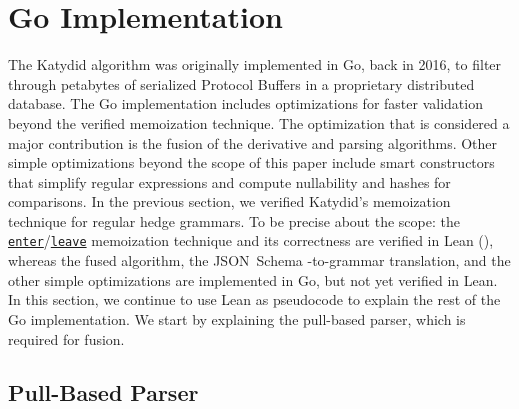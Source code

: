 \documentclass[runningheads]{llncs}
\newcommand{\link}[2]{\mbox{\hyperref[#2]{\lstinline{#1}}}\xspace}
\newcommand{\enter}{\link{enter}{def enter}}
\newcommand{\leave}{\link{leave}{def leave}}
\newcommand{\JSONSchema}{%
  JSON~Schema\xspace%
}
\begin{document}
\section{Go Implementation}
\label{section_go}

The Katydid algorithm was originally implemented in Go, back in 2016, to filter through petabytes of serialized Protocol Buffers in a proprietary distributed database.
The Go implementation includes optimizations for faster validation beyond the verified memoization technique.
The optimization that is considered a major contribution is the fusion of the derivative and parsing algorithms.
Other simple optimizations beyond the scope of this paper include smart constructors that simplify regular expressions and compute nullability and hashes for comparisons.
In the previous section, we verified Katydid's memoization technique for regular hedge grammars.
To be precise about the scope: the \enter/\leave memoization technique and its correctness are verified in Lean (), whereas the fused algorithm, the \JSONSchema-to-grammar translation, and the other simple optimizations are implemented in Go, but not yet verified in Lean.
In this section, we continue to use Lean as pseudocode to explain the rest of the Go implementation.
We start by explaining the pull-based parser, which is required for fusion.

\subsection{Pull-Based Parser}
\end{document}
